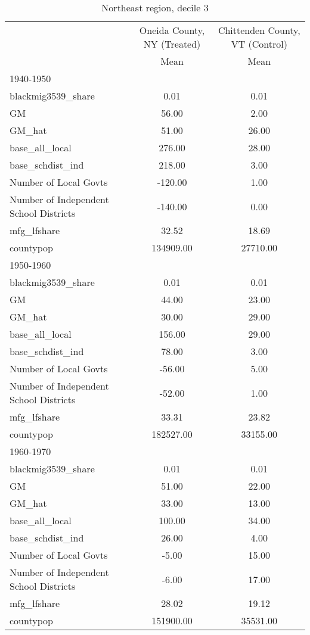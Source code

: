 \begin{table}[htbp]\centering
\def\sym#1{\ifmmode^{#1}\else\(^{#1}\)\fi}
\caption{Northeast region, decile 3 \label{tab1}}
\begin{tabular}{l*{2}{c}}
\toprule
                    &\multicolumn{1}{c}{Oneida County, NY (Treated)}&\multicolumn{1}{c}{Chittenden County, VT (Control)}\\
                    &        Mean&        Mean\\
\midrule
1940-1950           &            &            \\
blackmig3539\_share  &        0.01&        0.01\\
GM                  &       56.00&        2.00\\
GM\_hat              &       51.00&       26.00\\
base\_all\_local      &      276.00&       28.00\\
base\_schdist\_ind    &      218.00&        3.00\\
Number of Local Govts&     -120.00&        1.00\\
Number of Independent School Districts&     -140.00&        0.00\\
mfg\_lfshare         &       32.52&       18.69\\
countypop           &   134909.00&    27710.00\\
\midrule
1950-1960           &            &            \\
blackmig3539\_share  &        0.01&        0.01\\
GM                  &       44.00&       23.00\\
GM\_hat              &       30.00&       29.00\\
base\_all\_local      &      156.00&       29.00\\
base\_schdist\_ind    &       78.00&        3.00\\
Number of Local Govts&      -56.00&        5.00\\
Number of Independent School Districts&      -52.00&        1.00\\
mfg\_lfshare         &       33.31&       23.82\\
countypop           &   182527.00&    33155.00\\
\midrule
1960-1970           &            &            \\
blackmig3539\_share  &        0.01&        0.01\\
GM                  &       51.00&       22.00\\
GM\_hat              &       33.00&       13.00\\
base\_all\_local      &      100.00&       34.00\\
base\_schdist\_ind    &       26.00&        4.00\\
Number of Local Govts&       -5.00&       15.00\\
Number of Independent School Districts&       -6.00&       17.00\\
mfg\_lfshare         &       28.02&       19.12\\
countypop           &   151900.00&    35531.00\\
\bottomrule
\end{tabular}
\end{table}

